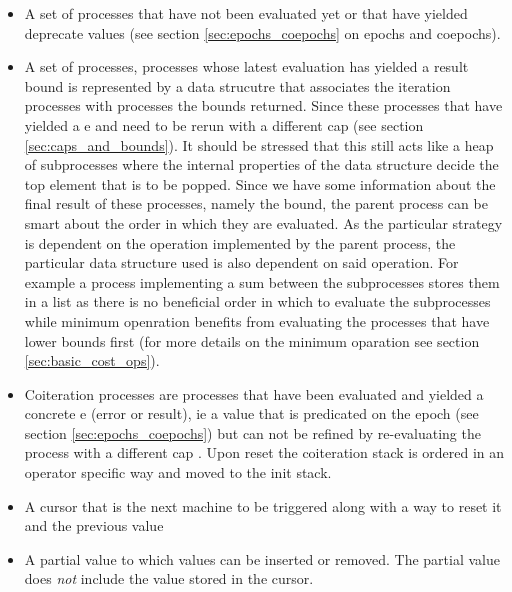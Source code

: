 \begin{itemize}
\item A set of  processes that have not been evaluated
  yet or that have yielded deprecate values (see section
  \ref{sec:epochs_coepochs} on epochs and coepochs).
\item A set of  processes, processes whose latest
  evaluation has yielded a result bound is represented by a data
  strucutre that associates the iteration processes with
   processes the bounds returned. Since these processes
  that have yielded a e and need to be rerun with a different cap (see
  section \ref{sec:caps_and_bounds}). It should be stressed that this
  still acts like a heap of subprocesses where the internal properties
  of the data structure decide the top element that is to be
  popped. Since we have some information about the final result of
  these processes, namely the bound, the parent process can be smart
  about the order in which they are evaluated. As the particular
  strategy is dependent on the operation implemented by the parent
  process, the particular data structure used is also dependent on
  said operation. For example a process implementing a sum between the
  subprocesses stores them in a list as there is no beneficial order
  in which to evaluate the subprocesses while minimum openration
  benefits from evaluating the processes that have lower bounds first
  (for more details on the minimum oparation see section
  \ref{sec:basic_cost_ops}).
\item Coiteration processes are processes that have been evaluated and
  yielded a concrete e (error or result), ie a value that is
  predicated on the epoch (see section \ref{sec:epochs_coepochs}) but
  can not be refined by re-evaluating the process with a different cap
  . Upon reset the coiteration
  stack is ordered in an operator specific way and moved to the init
  stack.
\item A cursor that is the next machine to be triggered along with a
  way to reset it and the previous value
\item A partial value to which values can be inserted or removed. The
  partial value does \emph{not} include the value stored in the
  cursor.
\end{itemize}

